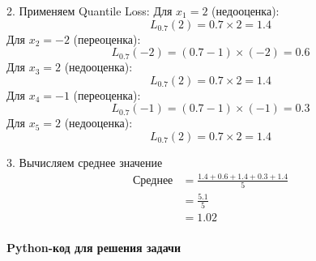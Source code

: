 2. Применяем Quantile Loss:
Для $x_1 = 2$ (недооценка):
\[
L_{0.7}(2) = 0.7 \times 2 = 1.4
\]
Для $x_2 = -2$ (переоценка):
\[
L_{0.7}(-2) = (0.7 - 1) \times (-2) = 0.6
\]
Для $x_3 = 2$ (недооценка):
\[
L_{0.7}(2) = 0.7 \times 2 = 1.4
\]
Для $x_4 = -1$ (переоценка):
\[
L_{0.7}(-1) = (0.7 - 1) \times (-1) = 0.3
\]
Для $x_5 = 2$ (недооценка):
\[
L_{0.7}(2) = 0.7 \times 2 = 1.4
\]

3. Вычисляем среднее значение
\[
\begin{aligned}
\text{Среднее} &= \frac{1.4 + 0.6 + 1.4 + 0.3 + 1.4}{5} \\
&= \frac{5.1}{5} \\
&= 1.02
\end{aligned}
\]

\paragraph*{Python-код для решения задачи}

